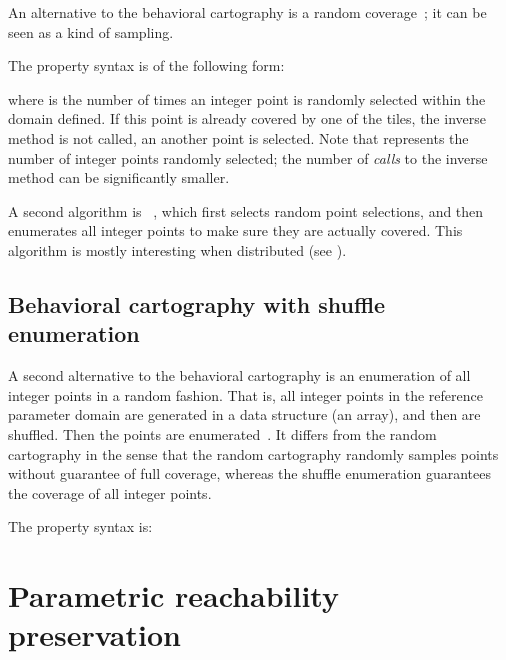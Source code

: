 An alternative to the behavioral cartography is a random coverage~\cite{AF10}; it can be seen as a kind of sampling.

The property syntax is of the following form:



\noindent{}where  is the number of times an integer point is randomly selected within the domain defined.
If this point is already covered by one of the tiles, the inverse method is not called, an another point is selected.
Note that  represents the number of integer points randomly selected; the number of \emph{calls} to the inverse method can be significantly smaller.

A second algorithm is ~\cite{ACE14}, which first selects random point selections, and then enumerates all integer points to make sure they are actually covered.
This algorithm is mostly interesting when distributed (see \cite{ACE14,ACN15}).


\subsection*{Behavioral cartography with shuffle enumeration}\label{sss:mode:BC:shuffle}

A second alternative to the behavioral cartography is an enumeration of all integer points in a random fashion.
That is, all integer points in the reference parameter domain are generated in a data structure (an array), and then are shuffled.
Then the points are enumerated~\cite{ACN15}.
It differs from the random cartography in the sense that the random cartography randomly samples points without guarantee of full coverage, whereas the shuffle enumeration guarantees the coverage of all integer points.

The property syntax is:




\section{Parametric reachability preservation}\label{ss:mode:PRP}

